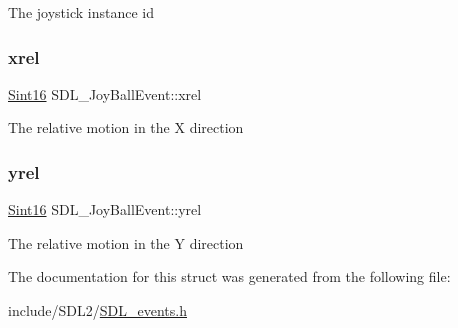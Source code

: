 The joystick instance id \mbox{\label{struct_s_d_l___joy_ball_event_a959a8473aa1964e5e1778c27a9ffd261}} 
\subsubsection{\texorpdfstring{xrel}{xrel}}
{\footnotesize\ttfamily \hyperlink{_s_d_l__stdinc_8h_a9d0257032c0e146ab6121bf0122712f5}{Sint16} S\+D\+L\+\_\+\+Joy\+Ball\+Event\+::xrel}

The relative motion in the X direction \mbox{\label{struct_s_d_l___joy_ball_event_a28ad48a9eb7a5d3ff62ccba09fcead76}} 
\subsubsection{\texorpdfstring{yrel}{yrel}}
{\footnotesize\ttfamily \hyperlink{_s_d_l__stdinc_8h_a9d0257032c0e146ab6121bf0122712f5}{Sint16} S\+D\+L\+\_\+\+Joy\+Ball\+Event\+::yrel}

The relative motion in the Y direction 

The documentation for this struct was generated from the following file\+:\begin{DoxyCompactItemize}
\item 
include/\+S\+D\+L2/\hyperlink{_s_d_l__events_8h}{S\+D\+L\+\_\+events.\+h}\end{DoxyCompactItemize}
